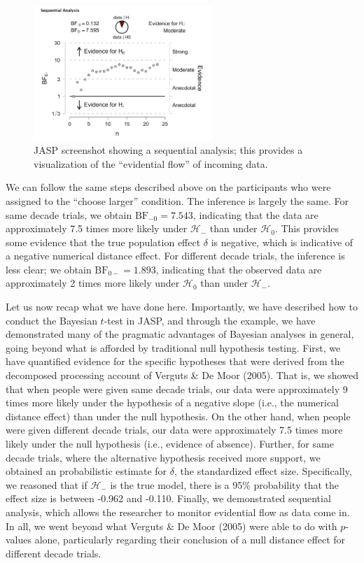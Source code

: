 \documentclass[english,,doc,floatsintext]{apa6}
\begin{document}
\begin{figure}[htbp]
\centering
\includegraphics[width=0.6\textwidth,height=\textheight]{figures/ttestSequential.png}
\caption{\label{fig:ttestSequential}JASP screenshot showing a sequential analysis; this provides a visualization of the \enquote{evidential flow} of incoming data.}
\end{figure}

We can follow the same steps described above on the participants who were assigned to the \enquote{choose larger} condition. The inference is largely the same. For same decade trials, we obtain \(\text{BF}_{-0}=7.543\), indicating that the data are approximately 7.5 times more likely under \(\mathcal{H}_{-}\) than under \(\mathcal{H}_{0}\). This provides some evidence that the true population effect \(\delta\) is negative, which is indicative of a negative numerical distance effect. For different decade trials, the inference is less clear; we obtain \(\text{BF}_{0-}=1.893\), indicating that the observed data are approximately 2 times more likely under \(\mathcal{H}_{0}\) than under \(\mathcal{H}_{-}\).

Let us now recap what we have done here. Importantly, we have described how to conduct the Bayesian \(t\)-test in JASP, and through the example, we have demonstrated many of the pragmatic advantages of Bayesian analyses in general, going beyond what is afforded by traditional null hypothesis testing. First, we have quantified evidence for the specific hypotheses that were derived from the decomposed processing account of Verguts \& De Moor (2005). That is, we showed that when people were given same decade trials, our data were approximately 9 times more likely under the hypothesis of a negative slope (i.e., the numerical distance effect) than under the null hypothesis. On the other hand, when people were given different decade trials, our data were approximately 7.5 times more likely under the null hypothesis (i.e., evidence of absence). Further, for same decade trials, where the alternative hypothesis received more support, we obtained an probabilistic estimate for \(\delta\), the standardized effect size. Specifically, we reasoned that if \(\mathcal{H}_{-}\) is the true model, there is a 95\% probability that the effect size is between -0.962 and -0.110. Finally, we demonstrated sequential analysis, which allows the researcher to monitor evidential flow as data come in. In all, we went beyond what Verguts \& De Moor (2005) were able to do with \(p\)-values alone, particularly regarding their conclusion of a null distance effect for different decade trials.
\end{document}
